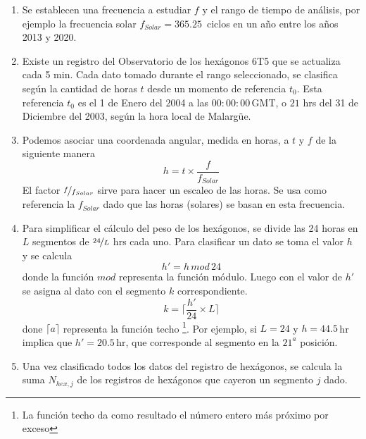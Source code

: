       \begin{enumerate}
        \item Se establecen una frecuencia a estudiar $f$ y el rango de tiempo de análisis, por ejemplo la frecuencia solar $f_{Solar}= 365.25\,$ ciclos en un año entre los años 2013 y 2020.

        \item Existe un registro del Observatorio de los hexágonos 6T5 que se actualiza cada 5 min. Cada dato tomado durante el rango seleccionado, se clasifica según la cantidad de horas $t$ desde un momento de referencia $t_0$. Esta referencia $t_0$ es el 1 de Enero del 2004 a las $00:00:00\,$GMT, o  $21$ hrs del 31 de Diciembre del 2003, según la hora local de Malargüe.

        \item Podemos asociar una coordenada angular, medida en horas,  a $t$  y $f$ de la siguiente manera
         \begin{equation}
          h = t \times \frac{f}{f_{Solar}}
          \label{eq:h_horas}
        \end{equation}
        El factor $\nicefrac{f}{f_{Solar}}$ sirve para hacer un escaleo de las horas. Se usa como referencia la $f_{Solar}$ dado que las horas (solares) se basan en esta frecuencia.
        
        \item Para simplificar el cálculo del peso de los hexágonos, se divide las 24 horas en $L$ segmentos de $\nicefrac{24}{L}$ hrs cada uno. Para clasificar un dato se  toma  el valor $h$  y se calcula
        \begin{equation}
          h' = h\, mod \,24 
          \label{eq:h_primado}
        \end{equation}
        donde la función $mod$ representa la función módulo. Luego con el valor de $h'$ se asigna al dato con el segmento $k$ correspondiente.
        \begin{equation}
          k = \bigg \lceil \frac{h'}{24}\times L \bigg \rceil
        \end{equation}
        done $\lceil a \rceil$ representa la función techo \footnote{La función techo da como resultado el número entero más próximo por exceso}. Por ejemplo, si $L=24$ y  $h=44.5\,$hr implica que $h'= 20.5\,$hr, que corresponde al segmento en la $21^{a}$ posición.

        \item Una vez clasificado todos los datos del registro de hexágonos, se calcula la suma  $N_{hex, j}$ de los registros de hexágonos que cayeron un segmento $j$ dado.


\end{enumerate}
